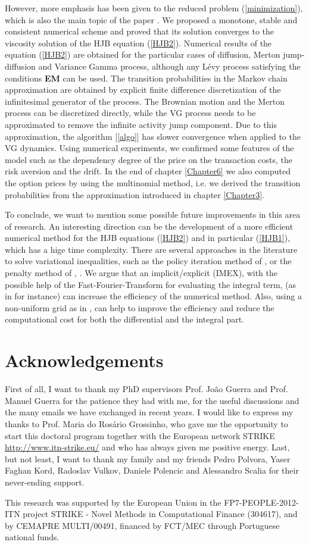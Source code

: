 However, more emphasis has been given to the reduced problem (\ref{minimization}), which is also the main topic of the paper \cite{Canta}.
We proposed a monotone, stable and consistent numerical scheme and proved that its solution converges to the viscosity solution of the
HJB equation (\ref{HJB2}).
Numerical results of the equation (\ref{HJB2}) are obtained for the particular cases of diffusion, Merton jump-diffusion and Variance Gamma process, 
although any Lévy process satisfying the conditions \textbf{EM} can be used. 
The transition probabilities in the Markov chain approximation are obtained by explicit finite difference discretization of the 
infinitesimal generator of the process. 
The Brownian motion and the Merton process can be discretized directly, 
while the VG process needs to be approximated to remove the infinite activity jump component.
Due to this approximation, the algorithm [\ref{algo}] has slower convergence when applied to the VG dynamics.
Using numerical experiments, we confirmed some features of the model such as the dependency degree of the price on the transaction costs, the risk aversion and the drift. 
In the end of chapter \ref{Chapter6} we also computed the option prices by using the multinomial method, i.e. we derived the transition probabilities 
from the approximation introduced in chapter \ref{Chapter3}. 

To conclude, we want to mention some possible future improvements in this area of research. 
An interesting direction can be the development of a more efficient numerical method for the HJB equations (\ref{HJB2}) and in particular (\ref{HJB1}), which has a hige time complexity.
There are several approaches in the literature to solve variational inequalities, such as the policy iteration method of \cite{FoHu12a}, or the penalty method of 
\cite{FoHu12b}, \cite{Song14}.
We argue that an implicit/explicit (IMEX), with the possible help of the Fast-Fourier-Transform for evaluating the integral term, (as in \cite{AnAn00} for instance) 
can increase the efficiency of the numerical method.
Also, using a non-uniform grid as in \cite{Haentjens13}, can help to improve the efficiency 
and reduce the computational cost for both the differential and the integral part.



\section*{Acknowledgements}

First of all, I want to thank my PhD supervisors Prof. João Guerra and Prof. Manuel Guerra for the
patience they had with me, for the useful discussions and the many emails we have exchanged in recent years.
I would like to express my thanks to Prof. Maria do Rosário Grossinho, who gave me the opportunity to start
this doctoral program together with the European network STRIKE \url{http://www.itn-strike.eu/} and who has always 
given me positive energy.
Last, but not least, I want to thank my family and my friends Pedro Polvora, Yaser Faghan Kord, Radoslav Vulkov, 
Daniele Polencic and Alessandro Scalia for their never-ending support.

This research was supported by the European Union in the FP7-PEOPLE-2012-ITN project STRIKE - 
Novel Methods in Computational Finance (304617), and by CEMAPRE
MULTI/00491, financed by FCT/MEC through Portuguese national funds.

